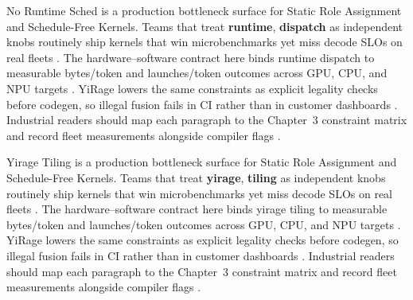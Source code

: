 No Runtime Sched is a production bottleneck surface for Static Role Assignment and Schedule-Free Kernels. Teams that treat \textbf{runtime}, \textbf{dispatch} as independent knobs routinely ship kernels that win microbenchmarks yet miss decode SLOs on real fleets \citep{memoryfloor2026,amd2024xdna}. The hardware--software contract here binds runtime dispatch to measurable bytes/token and launches/token outcomes across GPU, CPU, and NPU targets \citep{nvidia2022hopper,amd2024aie}. YiRage lowers the same constraints as explicit legality checks before codegen, so illegal fusion fails in CI rather than in customer dashboards \citep{semianalysis2024tma,dlbook}. Industrial readers should map each paragraph to the Chapter~3 constraint matrix and record fleet measurements alongside compiler flags \citep{amd2024xdna,dao2022flashattention}.

Yirage Tiling is a production bottleneck surface for Static Role Assignment and Schedule-Free Kernels. Teams that treat \textbf{yirage}, \textbf{tiling} as independent knobs routinely ship kernels that win microbenchmarks yet miss decode SLOs on real fleets \citep{nvidia2022hopper,amd2024aie}. The hardware--software contract here binds yirage tiling to measurable bytes/token and launches/token outcomes across GPU, CPU, and NPU targets \citep{semianalysis2024tma,dlbook}. YiRage lowers the same constraints as explicit legality checks before codegen, so illegal fusion fails in CI rather than in customer dashboards \citep{amd2024xdna,dao2022flashattention}. Industrial readers should map each paragraph to the Chapter~3 constraint matrix and record fleet measurements alongside compiler flags \citep{amd2024aie,kwon2023vllm}.

